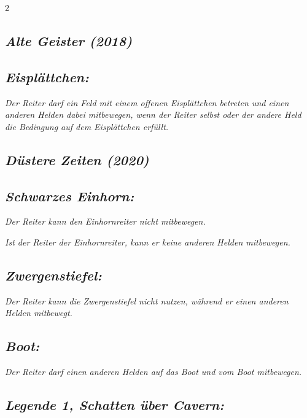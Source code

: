 \documentclass[10pt, a4paper, oneside]{book}
\newcommand{\fan}[1]{\textit{#1}}
\begin{document}
\begin{multicols*}{2}
\begin{bgcolor}[color-AG]
\section{\fan{Alte Geister (2018)}}


\subsection{\fan{Eisplättchen:}}

\fan{Der Reiter darf ein Feld mit einem offenen Eisplättchen betreten und einen anderen Helden dabei mitbewegen, wenn der Reiter selbst oder der andere Held die Bedingung auf dem Eisplättchen erfüllt.}


\end{bgcolor}




\columnbreak




\begin{bgcolor}[color-DZ]
\section{\fan{Düstere Zeiten (2020)}}

\subsection{\fan{Schwarzes Einhorn:}}

\fan{Der Reiter kann den Einhornreiter nicht mitbewegen.} 

\fan{Ist der Reiter der Einhornreiter, kann er keine anderen Helden mitbewegen.}



\subsection{\fan{Zwergenstiefel:}}

\fan{Der Reiter kann die Zwergenstiefel nicht nutzen, während er einen anderen Helden mitbewegt.}


\subsection{\fan{Boot:}}

\fan{Der Reiter darf einen anderen Helden auf das Boot und vom Boot mitbewegen.}



\subsection{\fan{Legende 1, Schatten über Cavern:}}


\end{bgcolor}
\end{multicols*}
\end{document}
